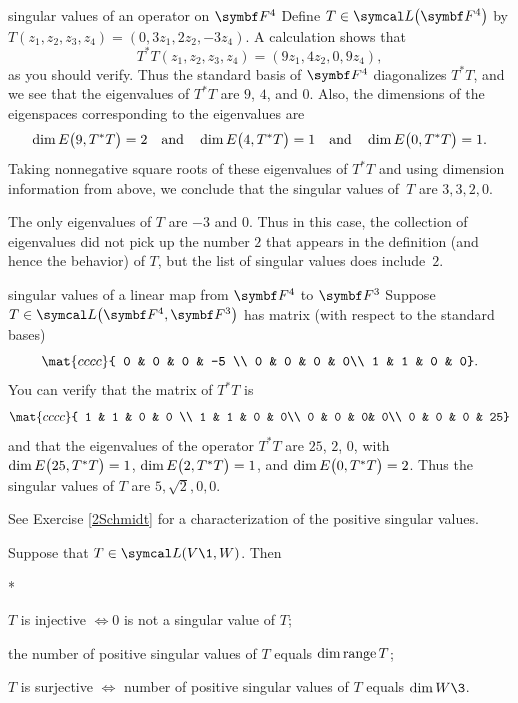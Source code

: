 \begin{example}[412]{singular values of an operator on\/ $\F4$}
Define $T \in \L\paren[\big]{\F{4}}$ by
$
T(z_1, z_2, z_3, z_4) = (0, 3 z_1, 2 z_2, -3z_4)$.
A calculation shows that
\[
T^*T(z_1, z_2, z_3, z_4) = (9 z_1, 4z_2, 0, 9z_4),
\]
as you should verify. Thus the standard basis of $\F4$ diagonalizes $T^*T$, and we see that the eigenvalues of $T^* T$ are $9$, $4$, and $0$. Also, the dimensions of the eigenspaces corresponding to the eigenvalues are
\[
\dim E\paren[\big]{9, T^* T} = 2 \andd \dim E\paren[\big]{4, T^* T} = 1 \andd \dim E\paren[\big]{0, T^*T} = 1.
\]
Taking nonnegative square roots of these eigenvalues of $T^*T$ and using dimension information from above, we conclude that the singular values of~$T$ are $3, 3, 2, 0$.

The only eigenvalues of $T$ are $-3$ and $0$. Thus in this case, the collection of eigenvalues did not pick up the number $2$ that appears in the definition (and hence the behavior) of $T$, but the list of singular values does include~$2$.
\end{example}

\begin{example}[43singular]{singular values of a linear map from\/ $\F4$ to\/ $\F3$}
Suppose $T \in \L\paren[\big]{ \F4, \F3 }$ has matrix (with respect to the standard bases)
\[
\mat{cccc}{
0 & 0 & 0 & -5 \\
0 & 0 & 0 & 0\\
1 & 1 & 0 & 0}.
\]
You can verify that the matrix of $T^* T$ is
\[
\mat{cccc}{
1 & 1 & 0 & 0 \\
1 & 1 & 0 & 0\\
0 & 0 & 0& 0\\
0 & 0 & 0 & 25}
\]
and that the eigenvalues of the operator $T^*T$ are $25$, $2$, $0$, with
$\dim E\paren[\big]{25, T^* T} = 1$, $\dim E\paren[\big]{2, T^* T} = 1$, and $\dim E\paren[\big]{0, T^*T} = 2$. Thus the singular values of $T$ are $5, \sqrt{2}, 0, 0$.
\end{example}

See Exercise \ref{2Schmidt} for a characterization of the positive singular values.

\pagebreak[3]


{Suppose that $T \in \L(V\1, W)$. Then
\begin{subtheorem}*
\item
$T$ is injective $\iff 0$ is not a singular value of $T$;
\item
the number of positive singular values of $T$ equals $\dim \ran T$;
\item
$T$ is surjective $\iff$ number of positive singular values of $T$ equals $\dim W\3$.
\end{subtheorem}}

